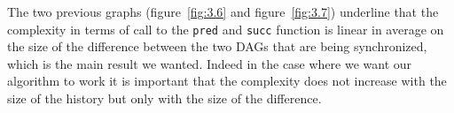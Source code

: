 The two previous graphs (figure~\ref{fig:3.6} and figure~\ref{fig:3.7}) underline that the complexity in terms of call to the \texttt{pred} and \texttt{succ} function is linear in average on the size of the difference between the two DAGs that are being synchronized, which is the main result we wanted. Indeed in the case where we want our algorithm to work it is important that the complexity does not increase with the size of the history but only with the size of the difference.
